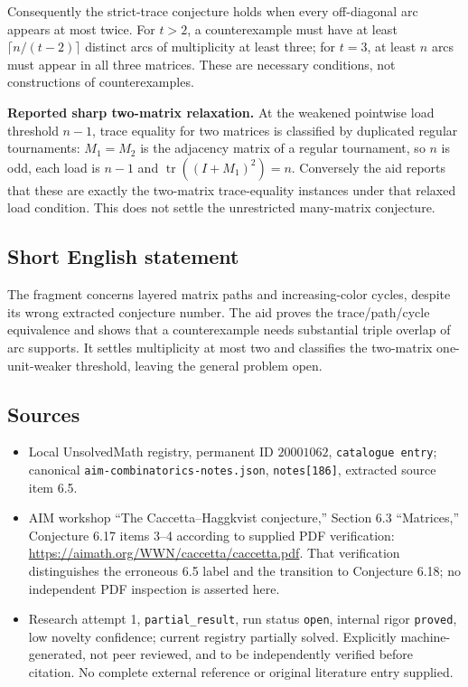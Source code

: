 \documentclass[11pt]{article}
\begin{document}
Consequently the strict-trace conjecture holds when every off-diagonal arc appears at most twice. For $t>2$, a counterexample must have at least $\lceil n/(t-2)\rceil$ distinct arcs of multiplicity at least three; for $t=3$, at least $n$ arcs must appear in all three matrices. These are necessary conditions, not constructions of counterexamples.

\textbf{Reported sharp two-matrix relaxation.} At the weakened pointwise load threshold $n-1$, trace equality for two matrices is classified by duplicated regular tournaments: $M_1=M_2$ is the adjacency matrix of a regular tournament, so $n$ is odd, each load is $n-1$ and $\operatorname{tr}((I+M_1)^2)=n$. Conversely the aid reports that these are exactly the two-matrix trace-equality instances under that relaxed load condition. This does not settle the unrestricted many-matrix conjecture.
\subsection{Short English statement}
The fragment concerns layered matrix paths and increasing-color cycles, despite its wrong extracted conjecture number. The aid proves the trace/path/cycle equivalence and shows that a counterexample needs substantial triple overlap of arc supports. It settles multiplicity at most two and classifies the two-matrix one-unit-weaker threshold, leaving the general problem open.
\subsection{Sources}
\begin{itemize}
\item Local UnsolvedMath registry, permanent ID $20001062$, \texttt{catalogue entry}; canonical \texttt{aim-combinatorics-notes.json}, \texttt{notes[186]}, extracted source item 6.5.
\item AIM workshop ``The Caccetta--Haggkvist conjecture,'' Section 6.3 ``Matrices,'' Conjecture 6.17 items 3--4 according to supplied PDF verification: \url{https://aimath.org/WWN/caccetta/caccetta.pdf}. That verification distinguishes the erroneous 6.5 label and the transition to Conjecture 6.18; no independent PDF inspection is asserted here.
\item Research attempt 1, \texttt{partial\_result}, run status \texttt{open}, internal rigor \texttt{proved}, low novelty confidence; current registry partially solved. Explicitly machine-generated, not peer reviewed, and to be independently verified before citation. No complete external reference or original literature entry supplied.
\end{itemize}
\end{document}
